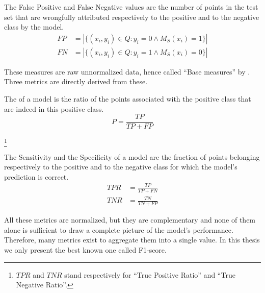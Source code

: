 \begin{definition}
The False Positive and False Negative values are the number of points in the test set that are wrongfully attributed respectively to the positive and to the negative class by the model.
\begin{equation}
    \begin{array}{ll}
         FP & = |\{(x_i, y_i)\in Q: y_i = 0 \land M_S(x_i) = 1\}| \\
         FN & = |\{(x_i, y_i)\in Q: y_i = 1 \land M_S(x_i) = 0\}|
    \end{array}
\end{equation}
\end{definition}

These measures are raw unnormalized data, hence called “Base measures” by \cite{Canbek2017_Class_metrics_terminology}. Three metrics are directly derived from these.

\begin{definition}
The  of a model is the ratio of the points associated with the positive class that are indeed in this positive class.
\begin{equation}
    P = \frac{TP}{TP+FP}
\end{equation}
\end{definition}

\begin{definition}\footnote{$TPR$ and $TNR$ stand respectively for “True Positive Ratio” and “True Negative Ratio”.}
    
    The Sensitivity and the Specificity of a model are the fraction of points belonging respectively to the positive and to the negative class for which the model's prediction is correct.
    \begin{equation}
        \begin{array}{ll}
             TPR & = \frac{TP}{TP+FN}  \\
             TNR & = \frac{TN}{TN+FP}
        \end{array}
    \end{equation}
\end{definition}

All these metrics are normalized, but they are complementary and none of them alone is sufficient to draw a complete picture of the model's performance. Therefore, many metrics exist to aggregate them into a single value. In this thesis we only present the best known one called F1-score.

